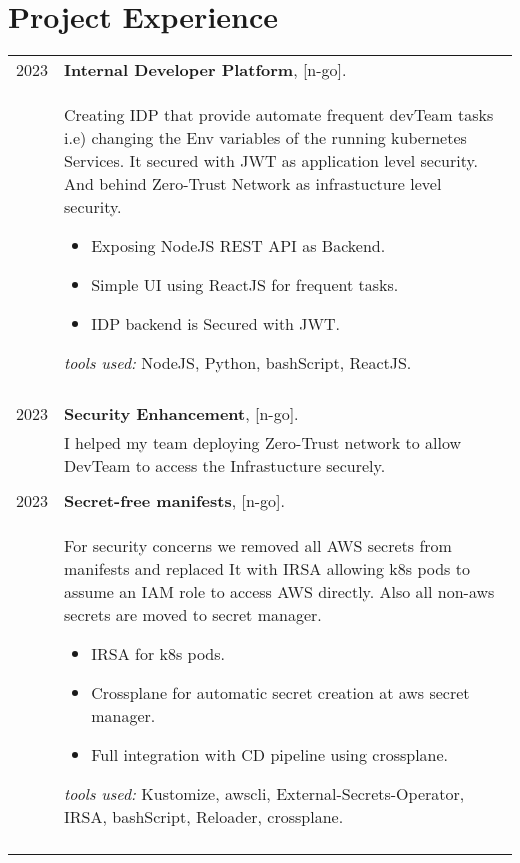 \documentclass[a4paper,10pt]{article}
\begin{document}
\section{\textbf{Project Experience}}  
    \begin{longtable}{r p{16cm}}

        2023  & \textbf{Internal Developer Platform}, [n-go].\\&
        Creating IDP that provide automate frequent devTeam tasks i.e) changing the Env variables of the running kubernetes Services. It secured with JWT as application level security. And behind Zero-Trust Network as infrastucture level security.          
        \begin{itemize}
            \item Exposing NodeJS REST API as Backend. 
            \item Simple UI using ReactJS for frequent tasks. 
            \item IDP backend is Secured with JWT. 
        \end{itemize}
        \textit{tools used: } NodeJS, Python, bashScript, ReactJS.\\
        &\\ 

        2023  & \textbf{Security Enhancement}, [n-go].\\&
        I helped my team deploying Zero-Trust network to allow  DevTeam to access the Infrastucture securely. \\
        &\\ 

        2023  & \textbf{Secret-free manifests}, [n-go].\\&
        For security concerns we removed all AWS secrets from manifests and replaced It with IRSA allowing k8s pods to assume an IAM role to access AWS directly. Also all non-aws secrets are moved to secret manager. 
        \begin{itemize}
            \item IRSA for k8s pods.
            \item Crossplane for automatic secret creation at aws secret manager.
            \item Full integration with CD pipeline using crossplane. 
        \end{itemize}
        \textit{tools used: } Kustomize, awscli, External-Secrets-Operator, IRSA, bashScript, Reloader, crossplane.\\
        &\\ 


\end{longtable}
\end{document}
